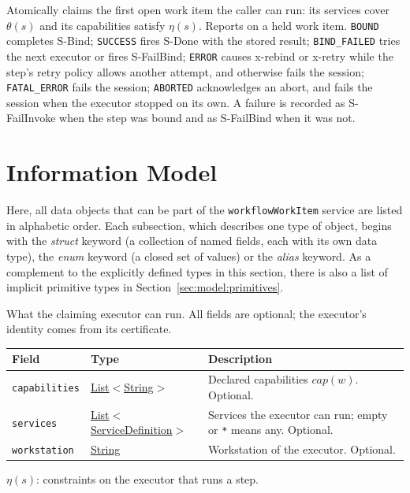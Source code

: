 \documentclass[a4paper]{arrowhead}
\newcommand{\pref}[1]{{\textcolor{ArrowheadGrey}{\hyperref[sec:model:primitives:#1]{#1}}}}
\begin{document}
Atomically claims the first open work item the caller can run: its services cover $\theta(s)$ and its capabilities satisfy $\eta(s)$.
Reports on a held work item. \texttt{BOUND} completes S-Bind; \texttt{SUCCESS} fires S-Done with the stored result; \texttt{BIND\_FAILED} tries the next executor or fires S-FailBind; \texttt{ERROR} causes x-rebind or x-retry while the step's retry policy allows another attempt, and otherwise fails the session; \texttt{FATAL\_ERROR} fails the session; \texttt{ABORTED} acknowledges an abort, and fails the session when the executor stopped on its own. A failure is recorded as S-FailInvoke when the step was bound and as S-FailBind when it was not.

\newpage
\section{Information Model}
\label{sec:model}
Here, all data objects that can be part of the \texttt{workflow\allowbreak{}Work\allowbreak{}Item} service are listed in alphabetic order. Each
subsection, which describes one type of object, begins with the \textit{struct} keyword (a collection of named fields,
each with its own data type), the \textit{enum} keyword (a closed set of values) or the \textit{alias} keyword. As a
complement to the explicitly defined types in this section, there is also a list of implicit primitive types in
Section~\ref{sec:model:primitives}.

What the claiming executor can run. All fields are optional; the executor's identity comes from its certificate.

{\small
\begin{longtable}{|p{3.9cm}|p{4.4cm}|p{7.5cm}|}

\hline
\rowcolor{gray!33} Field & Type & Description \\ \hline
\endhead
\texttt{capabilities} & \pref{List}$<$\pref{String}$>$ & Declared capabilities $cap(w)$. Optional. \\ \hline
\texttt{services} & \pref{List}$<$\pref{ServiceDefinition}$>$ & Services the executor can run; empty or \texttt{*} means any. Optional. \\ \hline
\texttt{workstation} & \pref{String} & Workstation of the executor. Optional. \\ \hline
\end{longtable}
}

$\eta(s)$: constraints on the executor that runs a step.
\end{document}
